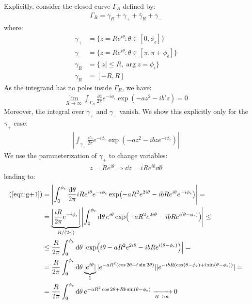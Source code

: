 \documentclass[../template.tex]{subfiles}
\begin{document}
Explicitly, consider the closed curve $\Gamma_R$ defined by:
\begin{align*}
    \Gamma_R = \gamma_R + \gamma_+ + \bar{\gamma}_R + \gamma_-
\end{align*}
where:
\begin{align*}
    \gamma_+ &= \{z = R e^{i \theta}\colon \theta\in [0, \phi_\epsilon] \}\\
    \gamma_- &= \{z = R e^{i \theta} \colon \theta \in [\pi, \pi + \phi_\epsilon]\}\\
    \gamma_R &= \{ |z| \leq R, \arg z = \phi_\epsilon\}\\
    \bar{\gamma}_R &= [-R, R]
\end{align*}
As the integrand has no poles inside $\Gamma_R$, we have:
\begin{align*}
    \lim_{R \to \infty} \int_{\Gamma_R} \frac{\dd{z}}{2\pi} e^{-i \phi_\epsilon}  \exp(-a z^2 - ib'z) = 0
\end{align*}
Moreover, the integral over $\gamma_+$ and $\gamma_-$ vanish. We show this explicitly only for the $\gamma_+$ case:
\begin{align} \label{eqn:g+1}
    \left| \int_{\gamma_+} \frac{\dd{z}}{2 \pi} e^{-i \phi_\epsilon} \exp(-az^2 - i b z e^{-i \phi_\epsilon})  \right|
\end{align}
We use the parameterization of $\gamma_+$ to change variables:
\begin{align*}
    z = R  e^{i \theta} \Rightarrow \dd{z} = i R e^{i \theta} \dd{\theta} 
\end{align*}
leading to:
\begin{align*}
    (\ref{eqn:g+1}) &= \left|\int_0^{\phi_\epsilon} \frac{\dd{\theta}}{2 \pi} i R e^{i \theta} e^{-i \phi_\epsilon} \exp(-a R^2 e^{2 i \theta} - i b R e^{i \theta} e^{-i \phi_\epsilon})  \right| =\\
    &= \underbrace{\left |\frac{iR}{2 \pi} e^{-i \phi_\epsilon}  \right|}_{R / (2\pi)} \left|\int_0^{\phi_\epsilon} \dd{\theta} e^{i \theta} \exp(-a R^2 e^{2i \theta} - i b R e^{i(\theta - \phi_\epsilon)})\right| \leq\\
    &\leq \frac{R}{2 \pi} \int_0^{\phi_\epsilon} \dd{\theta} \left|\exp(i \theta - aR^2 e^{2i \theta} - i b R e^{i(\theta - \phi_\epsilon)}) \right| =\\
    &= \frac{R}{2 \pi} \int_0^{\phi_\epsilon} \dd{\theta} \underbrace{|e^{i \theta}|}_{1} |e^{-aR^2 (\cos 2 \theta + i \sin 2 \theta)}| |e^{-ibR(\cos(\theta - \phi_\epsilon) + i \sin(\theta - \phi_\epsilon))}| =\\
    &= \frac{R}{2 \pi}   \int_0^{\phi_\epsilon} \dd{\theta} e^{-a R^2 \cos 2 \theta + R b \sin(\theta - \phi_\epsilon)}  \xrightarrow[R \to \infty]{}  0
\end{align*}
\end{document}
